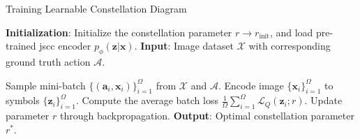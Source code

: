 \begin{algorithm}[t]
\caption{Training Learnable Constellation Diagram}
\label{alg_quantization}
\begin{algorithmic}[1]
\Statex \textbf{Initialization}: Initialize the constellation parameter
\Statex $r\rightarrow r_{\text{init}}$, and load pre-trained \gls{jscc} encoder $p_{\phi}(\bm{z}|\bm{x})$.
\State \textbf{Input}: Image dataset $\mathcal{X}$ with corresponding ground truth action $\mathcal{A}$.

    \State Sample mini-batch $\{(\bm{a}_i, \bm{x}_i) \}_{i=1}^{\Omega}$ from $\mathcal{X}$ and $\mathcal{A}$.
    \State Encode image $\{\bm{x}_i\}_{i=1}^{\Omega}$ to symbols $\{\bm{z}_i\}_{i=1}^{\Omega}$.
    \State Compute the average batch loss
    \Statex \quad \; $\frac{1}{\Omega}\sum_{i=1}^{\Omega}\mathcal{L}_{Q}(\bm{z}_i;r)$.
    \State Update parameter $r$ through backpropagation.
\EndWhile
\State \textbf{Output}: Optimal constellation parameter $r^*$.

\end{algorithmic}
\end{algorithm}
